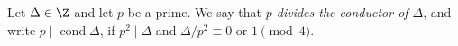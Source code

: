 Let $\Delta\in\Z$ and let $p$ be a prime. We say that \emph{$p$ divides the conductor of $\Delta$}, and write $p\mid\operatorname{cond}\Delta$, if
$p^2\mid\Delta$ and $\Delta/p^2\equiv0$ or $1\pmod 4$.
